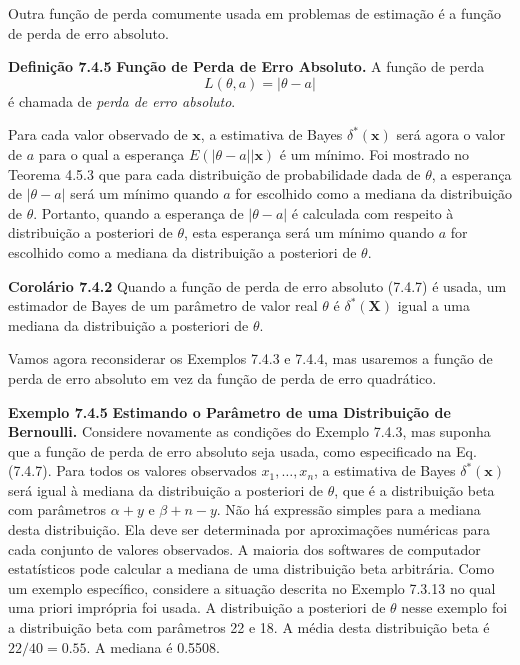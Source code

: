 Outra função de perda comumente usada em problemas de estimação é a função de perda de erro absoluto.

\vspace{1cm}
\noindent\textbf{Definição 7.4.5} \quad \textbf{Função de Perda de Erro Absoluto.} A função de perda
\begin{equation}
L(\theta, a) = |\theta-a| \tag{7.4.7}
\end{equation}
é chamada de \textit{perda de erro absoluto}.

\vspace{1cm}
Para cada valor observado de $\mathbf{x}$, a estimativa de Bayes $\delta^*(\mathbf{x})$ será agora o valor de $a$ para o qual a esperança $E(|\theta-a||\mathbf{x})$ é um mínimo. Foi mostrado no Teorema 4.5.3 que para cada distribuição de probabilidade dada de $\theta$, a esperança de $|\theta-a|$ será um mínimo quando $a$ for escolhido como a mediana da distribuição de $\theta$. Portanto, quando a esperança de $|\theta-a|$ é calculada com respeito à distribuição a posteriori de $\theta$, esta esperança será um mínimo quando $a$ for escolhido como a mediana da distribuição a posteriori de $\theta$.

\vspace{1cm}
\noindent\textbf{Corolário 7.4.2} \quad Quando a função de perda de erro absoluto (7.4.7) é usada, um estimador de Bayes de um parâmetro de valor real $\theta$ é $\delta^*(\mathbf{X})$ igual a uma mediana da distribuição a posteriori de $\theta$.

\vspace{1cm}
Vamos agora reconsiderar os Exemplos 7.4.3 e 7.4.4, mas usaremos a função de perda de erro absoluto em vez da função de perda de erro quadrático.

\vspace{1cm}
\noindent\textbf{Exemplo 7.4.5} \quad \textbf{Estimando o Parâmetro de uma Distribuição de Bernoulli.} Considere novamente as condições do Exemplo 7.4.3, mas suponha que a função de perda de erro absoluto seja usada, como especificado na Eq. (7.4.7). Para todos os valores observados $x_1, \dots, x_n$, a estimativa de Bayes $\delta^*(\mathbf{x})$ será igual à mediana da distribuição a posteriori de $\theta$, que é a distribuição beta com parâmetros $\alpha+y$ e $\beta+n-y$. Não há expressão simples para a mediana desta distribuição. Ela deve ser determinada por aproximações numéricas para cada conjunto de valores observados. A maioria dos softwares de computador estatísticos pode calcular a mediana de uma distribuição beta arbitrária.
Como um exemplo específico, considere a situação descrita no Exemplo 7.3.13 no qual uma priori imprópria foi usada. A distribuição a posteriori de $\theta$ nesse exemplo foi a distribuição beta com parâmetros 22 e 18. A média desta distribuição beta é $22/40 = 0.55$. A mediana é 0.5508.

